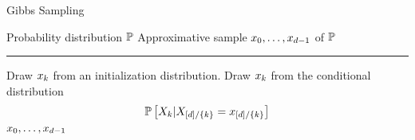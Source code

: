 \begin{algorithm}[hbt!]
    \caption{Gibbs Sampling}\label{alg:Gibbs}
    \begin{algorithmic}
        \Require Probability distribution $\mathbb{P}$
        \Ensure Approximative sample $x_{0},\ldots,x_{d-1}$ of $\mathbb{P}$
        \hrule
        \For{$\catenumeratorin$}
            \State Draw $x_{k}$ from an initialization distribution. %
        \EndFor
            \For{$\catenumeratorin$}
                \State Draw $x_{k}$ from the conditional distribution
                \begin{align*}
                    \mathbb{P}\left[X_{k}|X_{[d]/\{k\}}=x_{[d]/\{k\}}\right]
                \end{align*}
            \EndFor
        \EndWhile
        \Return $x_{0},\ldots,x_{d-1}$
    \end{algorithmic}
\end{algorithm}

